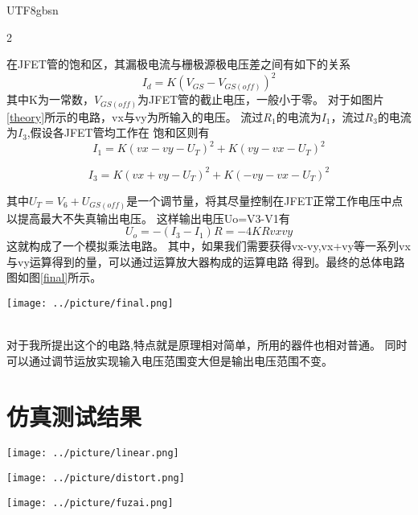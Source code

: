 \documentclass[a4paper,11pt,onecolumn,twoside]{article}
\begin{document}
\begin{CJK*}{UTF8}{gbsn}
\begin{multicols}{2}
{\normalsize
\indent 在JFET管的饱和区，其漏极电流与栅极源极电压差之间有如下的关系
				\begin{equation}
							I_d=K(V_{GS}-V_{GS(off)})^2
				\end{equation}
其中K为一常数，$V_{GS(off)}$为JFET管的截止电压，一般小于零。
对于如图片\ref{theory}所示的电路，vx与vy为所输入的电压。
流过$R_1$的电流为$I_1$，流过$R_3$的电流为$I_3$,假设各JFET管均工作在
饱和区则有
\begin{equation}
				I_1 = K(vx-vy-U_T)^2+K(vy-vx-U_T)^2
\end{equation}

\begin{equation}
				I_3 = K(vx+vy-U_T)^2+K(-vy-vx-U_T)^2
\end{equation}

其中$U_T=V_6+U_{GS(off)}$是一个调节量，将其尽量控制在JFET正常工作电压中点以提高最大不失真输出电压。
这样输出电压Uo=V3-V1有
\begin{equation}
			U_o=-(I_3-I_1)R=-4KRvxvy
\end{equation}
这就构成了一个模拟乘法电路。
其中，如果我们需要获得vx-vy,vx+vy等一系列vx与vy运算得到的量，可以通过运算放大器构成的运算电路
得到。最终的总体电路图如图\ref{final}所示。

\begin{figure*}
\centering
\texttt{[image: ../picture/final.png]}
\caption{总体设计} \label{final}
\end{figure*}
				
\\
\indent 对于我所提出这个的电路,特点就是原理相对简单，所用的器件也相对普通。
同时可以通过调节运放实现输入电压范围变大但是输出电压范围不变。

\section{仿真测试结果}
\begin{figure*}
				\centering
				\texttt{[image: ../picture/linear.png]}
				\caption{模拟乘法器线性特性} \label{linear}
\end{figure*}

\begin{figure*}
				\centering
				\texttt{[image: ../picture/distort.png]}
				\caption{模拟乘法器失真特性} \label{distort}
\end{figure*}


\begin{figure*}
				\centering
				\texttt{[image: ../picture/fuzai.png]}
				\caption{模拟乘法器载波} \label{fuzai}
\end{figure*}

}
\end{multicols}
\end{CJK*}
\end{document}
